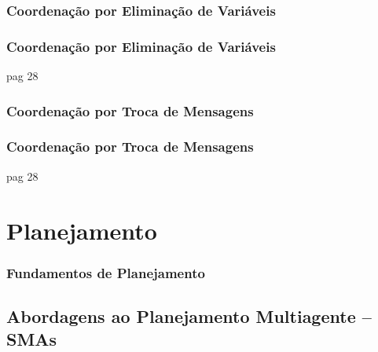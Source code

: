 \subsubsection{Coordenação por Eliminação de Variáveis}

\begin{frame}
\frametitle{Coordenação por Eliminação de Variáveis}

pag 28


\end{frame}


\subsubsection{Coordenação por Troca de Mensagens}

\begin{frame}
\frametitle{Coordenação por Troca de Mensagens}

pag 28


\end{frame}

\section{Planejamento}


\begin{frame}
\frametitle{Fundamentos de Planejamento}



\end{frame}


\subsection{Abordagens ao Planejamento Multiagente -- SMAs}

